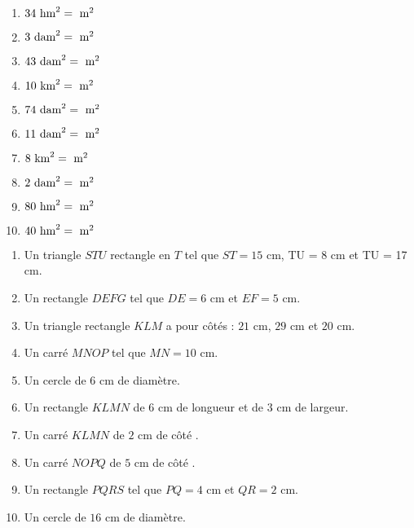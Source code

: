 \documentclass[a4paper,11pt,fleqn]{article}
\begin{document}

\begin{multicols}{2}
\begin{enumerate}[itemsep=2em]
	\item $ 34~\text{hm}^2 = \dotfill ~\text{m}^2$
	\item $ 3~\text{dam}^2 = \dotfill ~\text{m}^2$
	\item $ 43~\text{dam}^2 = \dotfill ~\text{m}^2$
	\item $ 10~\text{km}^2 = \dotfill ~\text{m}^2$
	\item $ 74~\text{dam}^2 = \dotfill ~\text{m}^2$
	\item $ 11~\text{dam}^2 = \dotfill ~\text{m}^2$
	\item $ 8~\text{km}^2 = \dotfill ~\text{m}^2$
	\item $ 2~\text{dam}^2 = \dotfill ~\text{m}^2$
	\item $ 80~\text{hm}^2 = \dotfill ~\text{m}^2$
	\item $ 40~\text{hm}^2 = \dotfill ~\text{m}^2$
\end{enumerate}
\end{multicols}


\begin{multicols}{2}
\begin{enumerate}
	\item Un triangle $STU$ rectangle en $T$ tel que $ST = 15$ cm, TU = 8 cm et TU = 17 cm.
	\item Un rectangle $DEFG$ tel que $DE = 6$ cm et $EF = 5$ cm.
	\item Un triangle rectangle $KLM$ a pour côtés : $21$ cm, $29$ cm et $20$ cm.
	\item Un carré $MNOP$ tel que $MN = 10$ cm.
	\item Un cercle de $6$ cm de diamètre.
	\item Un rectangle $KLMN$ de $6$ cm de longueur et de $3$ cm de largeur.
	\item Un carré $KLMN$ de $2$ cm de côté .
	\item Un carré $NOPQ$ de $5$ cm de côté .
	\item Un rectangle $PQRS$ tel que $PQ = 4$ cm et $QR = 2$ cm.
	\item Un cercle de $16$ cm de diamètre.
\end{enumerate}
\end{multicols}
\end{document}
